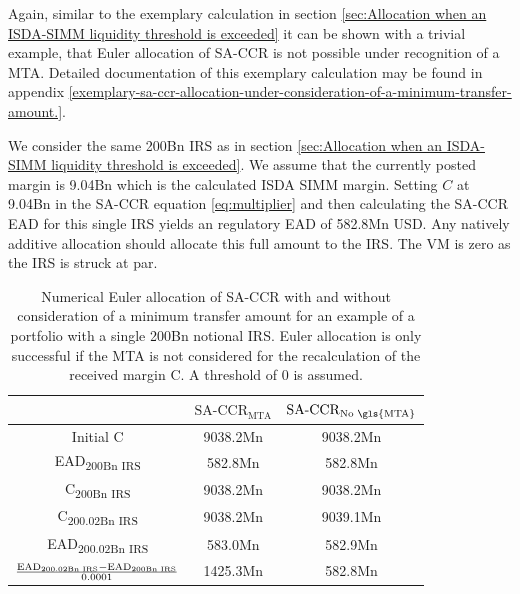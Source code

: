 \documentclass[../Thesis_AHoecherl.tex]{subfiles}
\begin{document}
    Again, similar to the exemplary calculation in section \ref{sec:Allocation when an ISDA-SIMM liquidity threshold is exceeded} it can be shown with a trivial example, that Euler allocation of \gls{SA-CCR} is not possible under recognition of a \gls{MTA}. Detailed documentation of this exemplary calculation may be found in appendix \ref{exemplary-sa-ccr-allocation-under-consideration-of-a-minimum-transfer-amount.}.
    
    We consider the same 200Bn \gls{IRS} as in section \ref{sec:Allocation when an ISDA-SIMM liquidity threshold is exceeded}. We assume that the currently posted margin is 9.04Bn which is the calculated \gls{ISDA SIMM} margin. 
    Setting $C$ at 9.04Bn in the \gls{SA-CCR} equation \ref{eq:multiplier} and then calculating the \gls{SA-CCR} \gls{EAD} for this single \gls{IRS} yields an regulatory \gls{EAD} of 582.8Mn USD. Any natively additive allocation should allocate this full amount to the \gls{IRS}.
    The \gls{VM} is zero as the \gls{IRS} is struck at par. 
    \begin{table}[htbp]
        \centering
        \begin{tabular}{c|c|c}
            & $\text{SA-CCR}_{\text{MTA}}$ & $\text{SA-CCR}_{\text{No \gls{MTA}}}$ \\
            \toprule
            Initial C & 9038.2Mn & 9038.2Mn \\
            \midrule
            EAD\textsubscript{200Bn IRS} & 582.8Mn & 582.8Mn \\
            \midrule
            C\textsubscript{200Bn IRS} & 9038.2Mn & 9038.2Mn \\
            \midrule
            C\textsubscript{200.02Bn IRS} & 9038.2Mn & 9039.1Mn \\
            \midrule
            EAD\textsubscript{200.02Bn IRS} & 583.0Mn & 582.9Mn \\
            \midrule
            $\frac{\text{EAD\textsubscript{200.02Bn IRS}}-\text{EAD\textsubscript{200Bn IRS}}}{0.0001}$ & 1425.3Mn & 582.8Mn  \\
        \end{tabular}%
        \caption[Impact of an \gls{MTA} on an allocation]{Numerical Euler allocation of \gls{SA-CCR} with and without consideration of a minimum transfer amount for an example of a portfolio with a single 200Bn notional \gls{IRS}. Euler allocation is only successful if the \gls{MTA} is not considered for the recalculation of the received margin C. A threshold of 0 is assumed.}
        \label{tab:Allocate SA-CCR with MTA calculation}
    \end{table}
\end{document}
